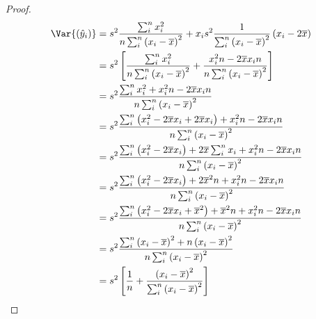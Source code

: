 \documentclass{article}
\begin{document}
\begin{proof}
    \allowdisplaybreaks{}
    \begin{align*}
        \Var{\left( \hat{y}_i \right)} & = s^2 \frac{\sum_i^n x_i^2}{n\sum_i^n \left( x_i - \overline{x} \right)^2} + x_i s^2 \frac{1}{\sum_i^n \left( x_i - \overline{x} \right)^2} \left( x_i - 2 \overline{x} \right)    \\
                                       & = s^2 \left[ \frac{\sum_i^n x_i^2}{n \sum_i^n \left( x_i - \overline{x} \right)^2} + \frac{x_i^2 n - 2 \overline{x} x_i n}{n \sum_i^n \left( x_i - \overline{x} \right)^2} \right] \\
                                       & = s^2 \frac{\sum_i^n x_i^2 + x_i^2 n - 2 \overline{x} x_i n}{n\sum_i^n \left( x_i - \overline{x} \right)^2}                                                                        \\
                                       & = s^2 \frac{\sum_i^n \left( x_i^2 - 2\overline{x}x_i + 2\overline{x} x_i \right) + x_i^2 n - 2 \overline{x} x_i n}{n\sum_i^n \left( x_i - \overline{x} \right)^2}                  \\
                                       & = s^2 \frac{\sum_i^n \left( x_i^2 - 2\overline{x}x_i \right) + 2\overline{x} \sum_i^n x_i + x_i^2 n - 2 \overline{x} x_i n}{n\sum_i^n \left( x_i - \overline{x} \right)^2}         \\
                                       & = s^2 \frac{\sum_i^n \left( x_i^2 - 2\overline{x}x_i \right) + 2\overline{x}^2 n + x_i^2 n - 2 \overline{x} x_i n}{n\sum_i^n \left( x_i - \overline{x} \right)^2}                  \\
                                       & = s^2 \frac{\sum_i^n \left( x_i^2 - 2\overline{x}x_i + \overline{x}^2 \right) + \overline{x}^2 n + x_i^2 n - 2 \overline{x} x_i n}{n\sum_i^n \left( x_i - \overline{x} \right)^2}  \\
                                       & = s^2 \frac{\sum_i^n \left( x_i - \overline{x} \right)^2 + n \left( x_i - \overline{x} \right)^2}{n\sum_i^n \left( x_i - \overline{x} \right)^2}                                   \\
                                       & = s^2 \left[ \frac{1}{n} + \frac{\left( x_i - \overline{x} \right)^2}{\sum_i^n \left( x_i - \overline{x} \right)^2} \right]
    \end{align*}
    \endgroup
\end{proof}
\end{document}
